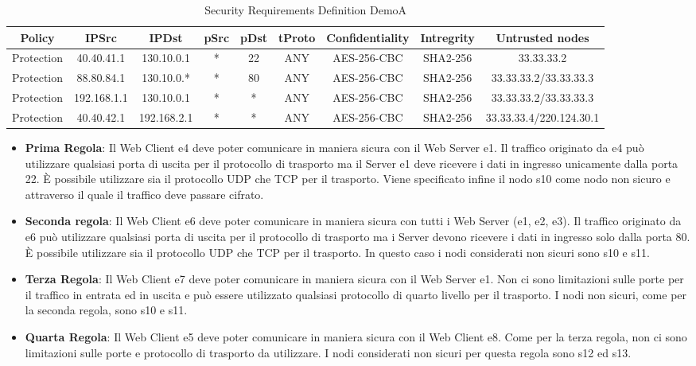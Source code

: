 \begin{table}[H]
    \centering
    \small
    \setlength{\tabcolsep}{1pt} %
    \begin{tabular}{ccccccccc}
        \hline
         Policy & IPSrc & IPDst & pSrc & pDst & tProto & Confidentiality & Intregrity & Untrusted nodes\\
        \hline
        Protection & 40.40.41.1 & 130.10.0.1 & * & 22 & ANY & AES-256-CBC & SHA2-256 & 33.33.33.2 \\
        Protection & 88.80.84.1 & 130.10.0.* & * & 80 & ANY & AES-256-CBC & SHA2-256 & 33.33.33.2/33.33.33.3 \\
        Protection & 192.168.1.1 & 130.10.0.1 & * & * & ANY & AES-256-CBC & SHA2-256 & 33.33.33.2/33.33.33.3 \\
        Protection & 40.40.42.1 & 192.168.2.1 & * & * & ANY & AES-256-CBC & SHA2-256 & 33.33.33.4/220.124.30.1 \\
        \hline
    \end{tabular}
    \caption{Security Requirements Definition DemoA}
    \label{tab:tabella}
\end{table}
\begin{itemize}
    \item \textbf{Prima Regola}: Il Web Client e4 deve poter comunicare in maniera sicura con il Web Server e1. Il traffico originato da e4 può utilizzare qualsiasi porta di uscita per il protocollo di trasporto ma il Server e1 deve ricevere i dati in ingresso unicamente dalla porta 22. È possibile utilizzare sia il protocollo UDP che TCP per il trasporto. Viene specificato infine il nodo s10 come nodo non sicuro e attraverso il quale il traffico deve passare cifrato.
    \item \textbf{Seconda regola}: Il Web Client e6 deve poter comunicare in maniera sicura con tutti i Web Server (e1, e2, e3). Il traffico originato da e6 può utilizzare qualsiasi porta di uscita per il protocollo di trasporto ma i Server devono ricevere i dati in ingresso solo dalla porta 80. È possibile utilizzare sia il protocollo UDP che TCP per il trasporto. In questo caso i nodi considerati non sicuri sono s10 e s11.
    \item \textbf{Terza Regola}: Il Web Client e7 deve poter comunicare in maniera sicura con il Web Server e1. Non ci sono limitazioni sulle porte per il traffico in entrata ed in uscita e può essere utilizzato qualsiasi protocollo di quarto livello per il trasporto. I nodi non sicuri, come per la seconda regola, sono s10 e s11. 
    \item \textbf{Quarta Regola}: Il Web Client e5 deve poter comunicare in maniera sicura con il Web Client e8. Come per la terza regola, non ci sono limitazioni sulle porte e protocollo di trasporto da utilizzare. I nodi considerati non sicuri per questa regola sono s12 ed s13.
\end{itemize}

